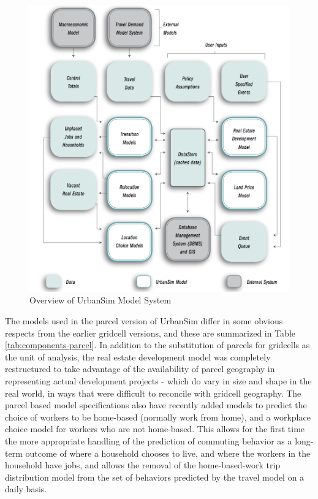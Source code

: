 \begin{figure}[htp]
\center
 \includegraphics[width=6.5in]
 {graphics/urbansim-overview.png}
\caption{Overview of UrbanSim Model System}
\label{fig:urbansim-overview}
\end{figure}

The models used in the parcel version of UrbanSim differ in some obvious respects from the earlier gridcell versions, and these are summarized in Table \ref{tab:components-parcel}.  In addition to the substitution of parcels for gridcells as the unit of analysis, the real estate development model was completely restructured to take advantage of the availability of parcel geography in representing actual development projects - which do vary in size and shape in the real world, in ways that were difficult to reconcile with gridcell geography.  The parcel based model specifications also have recently added models to predict the choice of workers to be home-based (normally work from home), and a workplace choice model for workers who are not home-based.  This allows for the first time the more appropriate handling of the prediction of commuting behavior as a long-term outcome of where a household chooses to live, and where the workers in the household have jobs, and allows the removal of the home-based-work trip distribution model from the set of behaviors predicted by the travel model on a daily basis.

